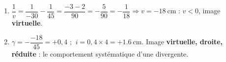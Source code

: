 \documentclass[11pt,a4paper]{article}
\begin{document}
\begin{corrige}
\begin{enumerate}[label=\alph*)]
  \item $\dfrac{1}{v}=\dfrac{1}{-30}-\dfrac{1}{45}=\dfrac{-3-2}{90}=-\dfrac{5}{90}=-\dfrac{1}{18}
        \Rightarrow v=-\qty{18}{\cm}$ : $v<0$, image \textbf{virtuelle}.
  \item $\gamma=-\dfrac{-18}{45}=+0{,}4$ ; $\ i=0{,}4\times 4=+\qty{1.6}{\cm}$. Image
        \textbf{virtuelle, droite, réduite} : le comportement systématique d'une divergente.
\end{enumerate}
\end{corrige}
\end{document}
